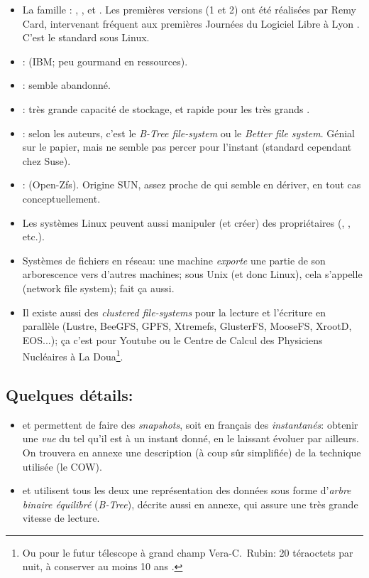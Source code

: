  \begin{itemize}
    \item La famille : , ,  et
      .
      Les premières versions (1 et 2) ont été réalisées par Remy
      Card, intervenant fréquent aux premières Journées du Logiciel
      Libre à Lyon  \cite{rcard}.
      C'est le  \sff{} standard sous Linux.

    \item {}: (IBM; peu gourmand en ressources).
    \item {}: semble abandonné.
    \item {}: très grande capacité de stockage, et rapide pour
      les très grands  \sffs.
    \item {}: selon les auteurs, c'est le \emph{B-Tree file-system}
      ou le \emph{Better file system}. Génial sur le papier, mais ne
      semble pas percer pour l'instant (standard cependant chez Suse).
    \item {}: (Open-Zfs). Origine SUN, assez proche de
       qui semble en dériver, en tout cas conceptuellement.

    \item Les systèmes Linux peuvent aussi manipuler (et créer) des
      \sffs{} propriétaires (, ,  etc.). 

    \item Systèmes de fichiers  en réseau: une machine \emph{exporte} une
     partie de son arborescence vers d'autres machines; sous Unix (et
     donc Linux), cela s'appelle  (network file
     system);  fait ça aussi. 
   \item  Il existe aussi des \emph{clustered file-systems} pour la lecture
     et l'écriture en parallèle (Lustre, BeeGFS, GPFS, Xtremefs,
     GlusterFS, MooseFS, XrootD, EOS...); ça c'est pour Youtube ou le
     Centre de Calcul des Physiciens Nucléaires à La Doua\footnote{Ou
       pour le futur télescope à grand champ Vera-C.~Rubin: 20
       téraoctets par nuit, à conserver au moins 10 ans \cite{verarubin}.}.
  \end{itemize}

  \subsection*{Quelques détails:}
  \begin{itemize}
    \item {} et  permettent de faire des
      \emph{snapshots}, soit en français des \emph{instantanés}:
      obtenir une \emph{vue} du  \sff{} tel qu'il est  à
     un instant donné, en le
      laissant évoluer par ailleurs. On
      trouvera en annexe une description (à coup sûr simplifiée) de la
      technique utilisée (le COW).
      \item {} et   utilisent tous les deux une
        représentation des données sous forme d'\emph{arbre binaire
          équilibré} (\emph{B-Tree}), décrite aussi en annexe, qui assure une
        très grande vitesse de lecture.
  \end{itemize}

